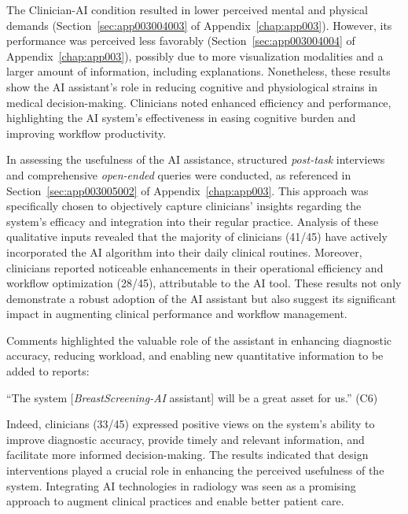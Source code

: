 \textcolor{revised}{The Clinician-AI condition resulted in lower perceived mental and physical demands (Section~\ref{sec:app003004003} of Appendix~\ref{chap:app003}).
However, its performance was perceived less favorably (Section~\ref{sec:app003004004} of Appendix~\ref{chap:app003}), possibly due to more visualization modalities and a larger amount of information, including explanations.
Nonetheless, these results show the \ac{AI} assistant's role in reducing cognitive and physiological strains in medical decision-making.
Clinicians noted enhanced efficiency and performance, highlighting the \ac{AI} system's effectiveness in easing cognitive burden and improving workflow productivity.}

In assessing the usefulness of the \ac{AI} assistance, structured {\it post-task} interviews and comprehensive {\it open-ended} queries were conducted, as referenced in Section~\ref{sec:app003005002} of Appendix~\ref{chap:app003}.
This approach was specifically chosen to objectively capture clinicians' insights regarding the system's efficacy and integration into their regular practice.
Analysis of these qualitative inputs revealed that the majority of clinicians (41/45) have actively incorporated the \ac{AI} algorithm into their daily clinical routines.
Moreover, clinicians reported noticeable enhancements in their operational efficiency and workflow optimization (28/45), attributable to the \ac{AI} tool.
These results not only demonstrate a robust adoption of the \ac{AI} assistant but also suggest its significant impact in augmenting clinical performance and workflow management.

\vspace{2.50mm}

\noindent
Comments highlighted the valuable role of the assistant in enhancing diagnostic accuracy, reducing workload, and enabling new quantitative information to be added to reports:

\vspace{2.50mm}

\noindent
``The system [{\it BreastScreening-AI} assistant] will be a great asset for us.'' (C6)

\vspace{2.50mm}


Indeed, clinicians (33/45) expressed positive views on the system's ability to improve diagnostic accuracy, provide timely and relevant information, and facilitate more informed decision-making.
The results indicated that design interventions played a crucial role in enhancing the perceived usefulness of the system.
Integrating \ac{AI} technologies in radiology was seen as a promising approach to augment clinical practices and enable better patient care.

